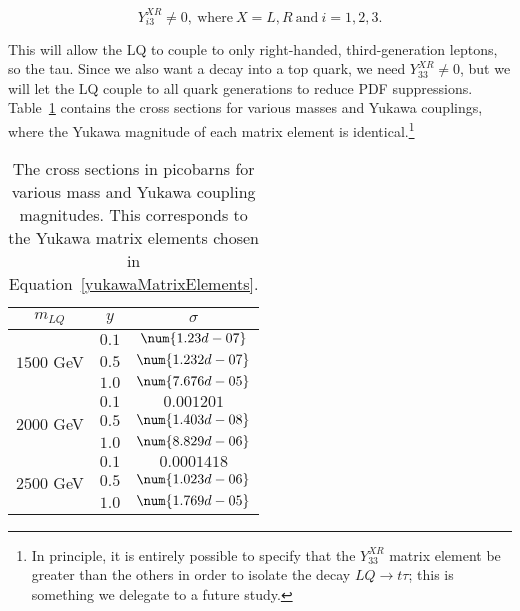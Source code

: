         \begin{equation}
            Y^{XR}_{i3} \neq 0,\ \text{where}\ X=L,R\ \text{and}\ i=1,2,3.
        \end{equation}\label{yukawaMatrixElements}

         This will allow the LQ to couple to only right-handed, third-generation leptons, so the tau. Since we also want a decay into a top quark, we need $Y^{XR}_{33} \neq 0$, but we will let the LQ couple to all quark generations to reduce PDF suppressions. Table~\ref{crossSections} contains the cross sections for various masses and Yukawa couplings, where the Yukawa magnitude of each matrix element is identical.\footnote{In principle, it is entirely possible to specify that the $Y^{XR}_{33}$ matrix element be greater than the others in order to isolate the decay $LQ \rightarrow t\tau$; this is something we delegate to a future study.}

        \renewcommand{\arraystretch}{1.15}
        \begin{table}[]
            \centering
            \begin{tabular}{c|c|c}
                $m_{LQ}$ & $y$ & $\sigma$ \\ \hline
                \multirow{3}{5em}{$1500$ GeV} & $0.1$ & $\num{1.23d-07}$ \\ \cline{2-3}
                & $0.5$ & $\num{1.232d-07}$ \\ \cline{2-3}
                & $1.0$ & $\num{7.676d-05}$ \\ \hline
                \multirow{3}{5em}{$2000$ GeV} & $0.1$ & $\num{0.001201}$ \\ \cline{2-3}
                & $0.5$ & $\num{1.403d-08}$ \\ \cline{2-3}
                & $1.0$ & $\num{8.829d-06}$ \\ \hline
                \multirow{3}{5em}{$2500$ GeV} & $0.1$ & $\num{0.0001418}$ \\ \cline{2-3}
                & $0.5$ & $\num{1.023d-06}$ \\ \cline{2-3}
                & $1.0$ & $\num{1.769d-05}$ \\ \hline
            \end{tabular}
            \caption{The cross sections in picobarns for various mass and Yukawa coupling magnitudes. This corresponds to the Yukawa matrix elements chosen in Equation~\eqref{yukawaMatrixElements}.}
            \label{crossSections}
        \end{table}
        \renewcommand{\arraystretch}{1}

